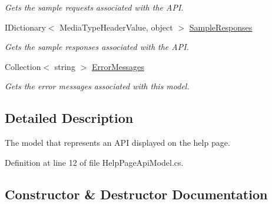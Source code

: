 \begin{DoxyCompactItemize}
\begin{DoxyCompactList}\small\item\em Gets the sample requests associated with the A\+P\+I. \end{DoxyCompactList}\item 
I\+Dictionary$<$ Media\+Type\+Header\+Value, object $>$ \hyperlink{class_open_1_1_g_i_1_1hypermart_1_1_areas_1_1_help_page_1_1_models_1_1_help_page_api_model_a08ca3610bd41722c64d0a58231e358a3}{Sample\+Responses}
\begin{DoxyCompactList}\small\item\em Gets the sample responses associated with the A\+P\+I. \end{DoxyCompactList}\item 
Collection$<$ string $>$ \hyperlink{class_open_1_1_g_i_1_1hypermart_1_1_areas_1_1_help_page_1_1_models_1_1_help_page_api_model_a318df386bf722bfbafab9a6f2812641e}{Error\+Messages}
\begin{DoxyCompactList}\small\item\em Gets the error messages associated with this model. \end{DoxyCompactList}\end{DoxyCompactItemize}


\subsection{Detailed Description}
The model that represents an A\+P\+I displayed on the help page. 



Definition at line 12 of file Help\+Page\+Api\+Model.\+cs.



\subsection{Constructor \& Destructor Documentation}
\hypertarget{class_open_1_1_g_i_1_1hypermart_1_1_areas_1_1_help_page_1_1_models_1_1_help_page_api_model_a34aa95dfea87b53bcfac8601fb1f3b93}{}
